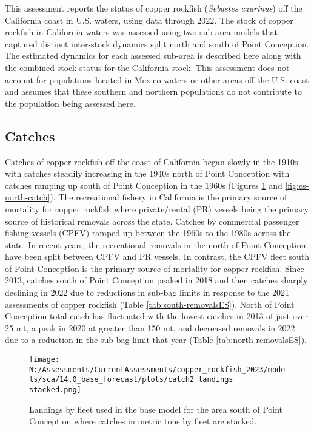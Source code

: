 \documentclass[11pt,
  english,
  letterpaper,
]{article}
\begin{document}
This assessment reports the status of copper rockfish (\emph{Sebastes caurinus}) off the California coast in U.S. waters, using data through 2022. The stock of copper rockfish in California waters was assessed using two sub-area models that captured distinct inter-stock dynamics split north and south of Point Conception. The estimated dynamics for each assessed sub-area is described here along with the combined stock status for the California stock. This assessment does not account for populations located in Mexico waters or other areas off the U.S. coast and assumes that these southern and northern populations do not contribute to the population being assessed here.

\hypertarget{catches}{%
\subsection*{Catches}\label{catches}}

Catches of copper rockfish off the coast of California began slowly in the 1910s with catches steadily increasing in the 1940s north of Point Conception with catches ramping up south of Point Conception in the 1960s (Figures \ref{fig:es-south-catch} and \ref{fig:es-north-catch}). The recreational fishery in California is the primary source of mortality for copper rockfish where private/rental (PR) vessels being the primary source of historical removals across the state. Catches by commercial passenger fishing vessels (CPFV) ramped up between the 1960s to the 1980s across the state. In recent years, the recreational removals in the north of Point Conception have been split between CPFV and PR vessels. In contrast, the CPFV fleet south of Point Conception is the primary source of mortality for copper rockfish. Since 2013, catches south of Point Conception peaked in 2018 and then catches sharply declining in 2022 due to reductions in sub-bag limits in response to the 2021 assessments of copper rockfish (Table \ref{tab:south-removalsES}). North of Point Conception total catch has fluctuated with the lowest catches in 2013 of just over 25 mt, a peak in 2020 at greater than 150 mt, and decreased removals in 2022 due to a reduction in the sub-bag limit that year (Table \ref{tab:north-removalsES}).





\begin{figure}
\centering
\texttt{[image: N:/Assessments/CurrentAssessments/copper\_rockfish\_2023/models/sca/14.0\_base\_forecast/plots/catch2 landings stacked.png]}
\caption{Landings by fleet used in the base model for the area south of Point Conception where catches in metric tons by fleet are stacked.\label{fig:es-south-catch}}
\end{figure}
\end{document}
